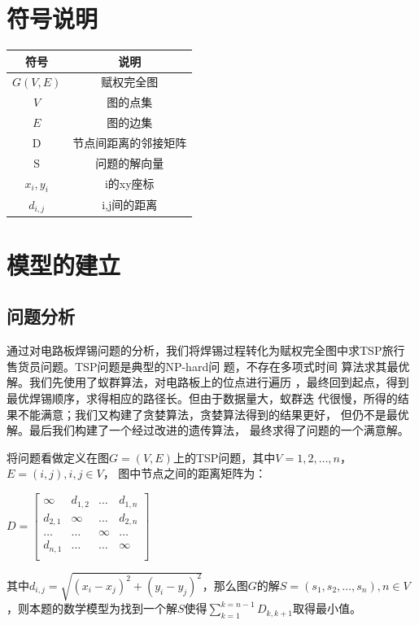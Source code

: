\documentclass[fontset=windows,a4paper,12pt]{ctexart}
\begin{document}
  \section{符号说明}
    \begin{center}
	  \begin{tabular}{|c|c|}
	  	\hline
	  	符号 & 说明 \\ 
	  	\hline 
	  	$G(V,E)$	&	赋权完全图\\
	  	$V$		& 图的点集\\
	  	$E$		& 图的边集\\
	  	D	&	节点间距离的邻接矩阵\\
	  	S	&	问题的解向量\\
	  	$x_i,y_i$	& i的xy座标\\
	  	$d_{i,j}$ & i,j间的距离\\
	  	\hline
	  \end{tabular} 
	\end{center}
  \newpage
  \section{模型的建立}
    \subsection{问题分析}
      通过对电路板焊锡问题的分析，我们将焊锡过程转化为赋权完全图中求TSP旅行
      售货员问题。TSP问题是典型的NP-hard问
      题\cite{gutin2006traveling}，不存在多项式时间
      算法求其最优解。我们先使用了蚁群算法，对电路板上的位点进行遍历
      ，最终回到起点，得到最优焊锡顺序，求得相应的路径长。但由于数据量大，蚁群迭
      代很慢，所得的结果不能满意；我们又构建了贪婪算法，贪婪算法得到的结果更好，
      但仍不是最优解。最后我们构建了一个经过改进的遗传算法\cite{楼建华2003数学建模与数学实验}，
      最终求得了问题的一个满意解。
      
      将问题看做定义在图$G=(V,E)$上的TSP问题，其中$V={1,2,\dots,n}$，$E=(i,j),i,j\in V$，
      图中节点之间的距离矩阵为：
      \begin{center}
      	      \begin{math}
      	      D=\left[
      	      \begin{array}{cccc}
      	      \infty & d_{1,2} & \dots & d_{1,n}\\
      	      d_{2,1} & \infty & \dots & d_{2,n}\\
      	      \dots & \dots & \infty & \dots \\
      	      d_{n,1} & \dots & \dots & \infty \\
      	      \end{array}
      	      \right]
      	      \end{math}
      \end{center}
	  其中$d_{i,j}=\sqrt{(x_i-x_j)^2+(y_i-y_j)^2}$，那么图$G$的解$S=(s_1,s_2,\dots,s_n),n \in V$，则本题的数学模型为找到一个解$S$使得$\sum_{k=1}^{k=n-1}D_{k,k+1}$取得最小值。
\end{document}
